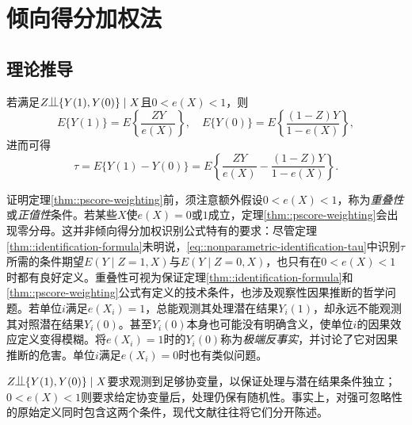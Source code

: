 \section{倾向得分加权法}

\subsection{理论推导}

\begin{theorem}
\label{thm::pscore-weighting}
若满足$Z\ind \{ Y(1), Y(0)  \} \mid X$且$0<e(X)<1$，则
$$
E\{  Y(1) \} =  E\left\{  \frac{ZY}{e(X)}  \right\},\quad
E\{  Y(0) \} =  E\left\{  \frac{(1-Z)Y}{1-e(X)}  \right\} ,
$$
进而可得
$$
\tau = E\{  Y(1) -  Y(0) \} =  E\left\{  \frac{ZY}{e(X)} - \frac{(1-Z)Y}{1-e(X)}   \right\} .
$$
\end{theorem}


证明定理\ref{thm::pscore-weighting}前，须注意额外假设$0<e(X)<1$，称为{\it 重叠性}或{\it 正值性}条件。若某些$X$使$e(X)=0$或$1$成立，定理\ref{thm::pscore-weighting}会出现零分母。这并非倾向得分加权识别公式特有的要求：尽管定理\ref{thm::identification-formula}未明说，\eqref{eq::nonparametric-identification-tau}中识别$\tau$所需的条件期望$E(Y\mid Z=1, X)$与$ E(Y\mid Z=0, X)$，也只有在$0< e(X) < 1$时都有良好定义。重叠性可视为保证定理\ref{thm::identification-formula}和\ref{thm::pscore-weighting}公式有定义的技术条件，也涉及观察性因果推断的哲学问题。若单位$i$满足$e(X_i)=1$，总能观测其处理潜在结果$Y_i(1)$，却永远不能观测其对照潜在结果$Y_i(0)$。甚至$Y_i(0)$本身也可能没有明确含义，使单位$i$的因果效应定义变得模糊。\citet{king2006dangers}将$e(X_i)=1$时的$Y_i(0)$称为{\it 极端反事实}，并讨论了它对因果推断的危害。单位$i$满足$e(X_i)=0$时也有类似问题。 
 
 
$Z\ind \{ Y(1), Y(0)  \} \mid X$要求观测到足够协变量，以保证处理与潜在结果条件独立；$0<e(X)<1$则要求给定协变量后，处理仍保有随机性。事实上，\citet{rosenbaum1983central}对强可忽略性的原始定义同时包含这两个条件，现代文献往往将它们分开陈述。 
 


 

